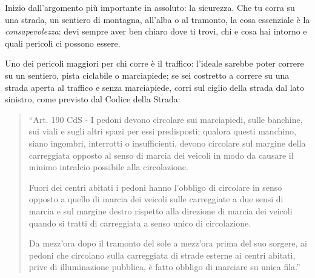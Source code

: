 Inizio dall'argomento più importante in assoluto: la sicurezza.
Che tu corra su una strada, un sentiero di montagna,
all'alba o al tramonto, la cosa essenziale è
la \emph{consapevolezza}:
devi sempre aver ben chiaro dove ti trovi,
chi e cosa hai intorno
e quali pericoli ci possono essere.

Uno dei pericoli maggiori per chi corre è il traffico:
l'ideale sarebbe poter correre
su un sentiero, pista ciclabile o marciapiede;
se sei costretto a correre su una strada aperta al traffico
e senza marciapiede, corri sul ciglio della strada
dal lato sinistro, come previsto dal
Codice della Strada:

\begin{quote}
``Art. 190 CdS - 
 I pedoni devono circolare sui marciapiedi, sulle banchine,
 sui viali e sugli altri spazi per essi predisposti; qualora questi manchino,
 siano ingombri, interrotti o insufficienti, devono circolare sul margine
 della carreggiata opposto al senso di marcia dei veicoli in modo da
 causare il minimo intralcio possibile alla circolazione.
 \par
 Fuori dei centri abitati i pedoni hanno l'obbligo di circolare
 in senso opposto a quello di marcia dei veicoli sulle carreggiate
 a due sensi di marcia e sul margine destro rispetto alla direzione
 di marcia dei veicoli quando si tratti di carreggiata a senso unico di circolazione.
 \par
 Da mezz'ora dopo il tramonto del sole a mezz'ora prima del suo sorgere,
 ai pedoni che circolano sulla carreggiata di strade esterne ai centri abitati,
 prive di illuminazione pubblica, è fatto obbligo di marciare su unica fila.''
\end{quote}

